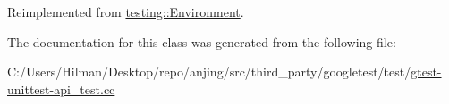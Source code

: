 Reimplemented from \hyperlink{classtesting_1_1_environment_a039bdaa705c46b9b88234cf4d3bb6254}{testing\+::\+Environment}.



The documentation for this class was generated from the following file\+:\begin{DoxyCompactItemize}
\item 
C\+:/\+Users/\+Hilman/\+Desktop/repo/anjing/src/third\+\_\+party/googletest/test/\hyperlink{gtest-unittest-api__test_8cc}{gtest-\/unittest-\/api\+\_\+test.\+cc}\end{DoxyCompactItemize}
